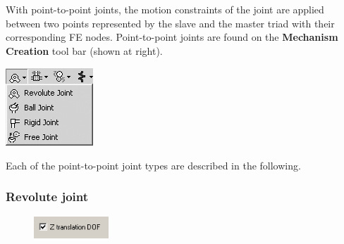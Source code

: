 \begin{minipage}{0.75\textwidth}
  \raggedright
  With point-to-point joints, the motion constraints of the joint are applied
  between two points represented by the slave and the master triad with
  their corresponding FE nodes. Point-to-point joints are found on the
  \textbf{Mechanism Creation} tool bar (shown at right).
\end{minipage}%
\hfill\begin{minipage}{0.2\textwidth}
\includegraphics[width=\textwidth]{Figures/1st_Joint_Pulldown}
\end{minipage}

Each of the point-to-point joint types are described in the following.


\subsubsection{Revolute joint}


\begin{figure}
  \includegraphics[width=0.25\textwidth]{Figures/4-ZtranslationDOF}
\end{figure}

